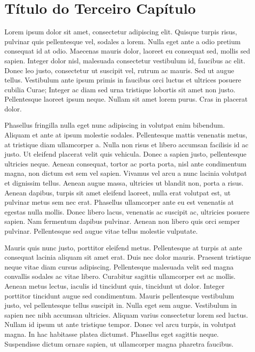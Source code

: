 \chapter{T\'{i}tulo do Terceiro Cap\'{i}tulo}
\label{cap:titulo do terceiro capitulo}

Lorem ipsum dolor sit amet, consectetur adipiscing elit. Quisque turpis risus, pulvinar quis pellentesque vel, sodales a lorem. Nulla eget ante a odio pretium consequat id at odio. Maecenas mauris dolor, laoreet eu consequat sed, mollis sed sapien. Integer dolor nisl, malesuada consectetur vestibulum id, faucibus ac elit. Donec leo justo, consectetur ut suscipit vel, rutrum ac mauris. Sed ut augue tellus. Vestibulum ante ipsum primis in faucibus orci luctus et ultrices posuere cubilia Curae; Integer ac diam sed urna tristique lobortis sit amet non justo. Pellentesque laoreet ipsum neque. Nullam sit amet lorem purus. Cras in placerat dolor.

Phasellus fringilla nulla eget nunc adipiscing in volutpat enim bibendum. Aliquam et ante at ipsum molestie sodales. Pellentesque mattis venenatis metus, at tristique diam ullamcorper a. Nulla non risus et libero accumsan facilisis id ac justo. Ut eleifend placerat velit quis vehicula. Donec a sapien justo, pellentesque ultricies neque. Aenean consequat, tortor ac porta porta, nisl ante condimentum magna, non dictum est sem vel sapien. Vivamus vel arcu a nunc lacinia volutpat et dignissim tellus. Aenean augue massa, ultricies ut blandit non, porta a risus. Aenean dapibus, turpis sit amet eleifend laoreet, nulla erat volutpat est, ut pulvinar metus sem nec erat. Phasellus ullamcorper ante eu est venenatis at egestas nulla mollis. Donec libero lacus, venenatis ac suscipit ac, ultricies posuere sapien. Nam fermentum dapibus pulvinar. Aenean non libero quis orci semper pulvinar. Pellentesque sed augue vitae tellus molestie vulputate.

Mauris quis nunc justo, porttitor eleifend metus. Pellentesque at turpis at ante consequat lacinia aliquam sit amet erat. Duis nec dolor mauris. Praesent tristique neque vitae diam cursus adipiscing. Pellentesque malesuada velit sed magna convallis sodales ac vitae libero. Curabitur sagittis ullamcorper est ac mollis. Aenean metus lectus, iaculis id tincidunt quis, tincidunt ut dolor. Integer porttitor tincidunt augue sed condimentum. Mauris pellentesque vestibulum justo, vel pellentesque tellus suscipit in. Nulla eget sem augue. Vestibulum in sapien nec nibh accumsan ultricies. Aliquam varius consectetur lorem sed luctus. Nullam id ipsum ut ante tristique tempor. Donec vel arcu turpis, in volutpat magna. In hac habitasse platea dictumst. Phasellus eget sagittis neque. Suspendisse dictum ornare sapien, ut ullamcorper magna pharetra faucibus.



